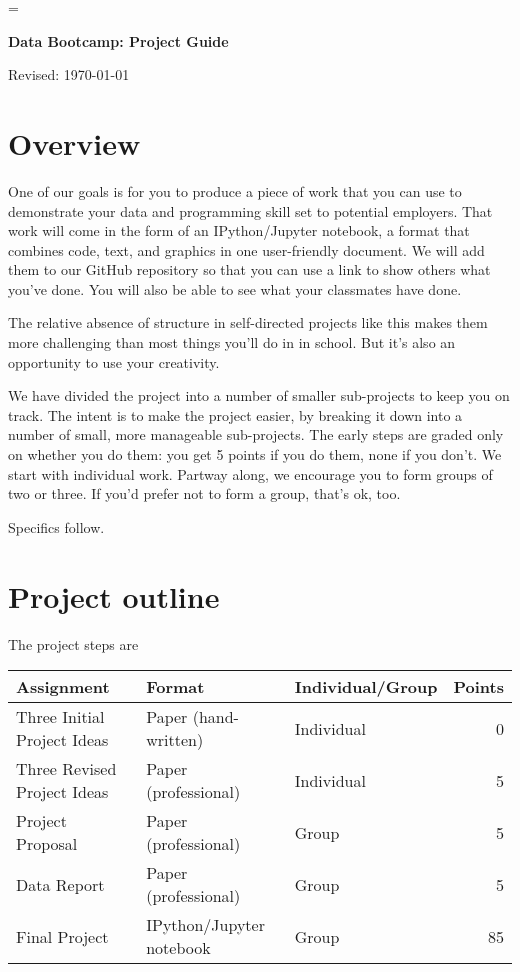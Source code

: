 \documentclass[11pt]{article}
\begin{document}
\parskip=\bigskipamount
\parindent=0.0in
\thispagestyle{empty}


\bigskip\bigskip
\centerline{\Large \bf Data Bootcamp:  Project Guide}
\centerline{Revised: \today}

\section*{Overview}

One of our goals is for you to produce a piece of work that you can use
to demonstrate your data and programming skill set to potential employers.
That work will come in the form of an IPython/Jupyter notebook,
a format that combines code, text, and graphics in one user-friendly document.
We will add them to our GitHub repository so that
you can use a link to show others what you've done.
You will also be able to see what your classmates have done.

The relative absence of structure in self-directed projects like this
makes them more challenging than most things you'll do in in school.
But it's also an opportunity to use your creativity.

We have divided the project into a number of smaller sub-projects to keep you on track.
The intent is to make the project easier, by breaking it down into a number
of small, more manageable sub-projects.
The early steps are graded only on whether you do them:
you get 5 points if you do them, none if you don't.
We start with individual work.  Partway along, we encourage you to form groups
of two or three.
If you'd prefer not to form a group, that's ok, too.

Specifics follow.


\section*{Project outline}

The project steps are
%
\begin{center}
\begin{tabular}{lllr}
\toprule
Assignment                  & Format  & Individual/Group &  Points \\
\midrule
Three Initial Project Ideas         & Paper (hand-written)  & Individual  & 0  \\
Three Revised Project Ideas & Paper (professional)  & Individual  & 5  \\
Project Proposal            & Paper (professional)  & Group       & 5  \\
Data Report                 & Paper (professional)  & Group       & 5  \\
Final Project               & IPython/Jupyter notebook      & Group       & 85 \\
\bottomrule
\end{tabular}
\end{center}
\end{document}
